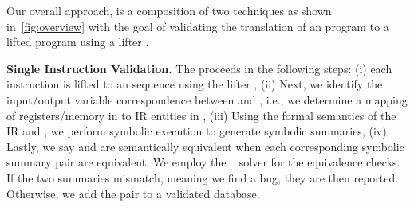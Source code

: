 


Our overall approach, is a composition of two techniques as shown
in~\ref{fig:overview} with the goal of validating the 
translation of an \ISA program  to a lifted \LLVM program  using a 
lifter .

\textbf{Single Instruction Validation.} The \siv proceeds in the following
steps: (i) each \ISA instruction  is lifted to an \LLVM sequence 
using the lifter , (ii) Next, we identify the input/output variable
correspondence between  and , i.e., we determine a mapping of
registers/memory in  to IR entities in ,  (iii) Using the formal
semantics of the IR and \ISA, we perform symbolic execution to generate
symbolic summaries, (iv) Lastly, we say  and  are semantically
equivalent when each corresponding symbolic summary pair are equivalent. We
employ the \Z~\cite{z3:2008} solver for the equivalence checks. If the two
summaries mismatch, meaning we find a bug, they are then reported.  Otherwise,
we add the pair  to a validated database.


